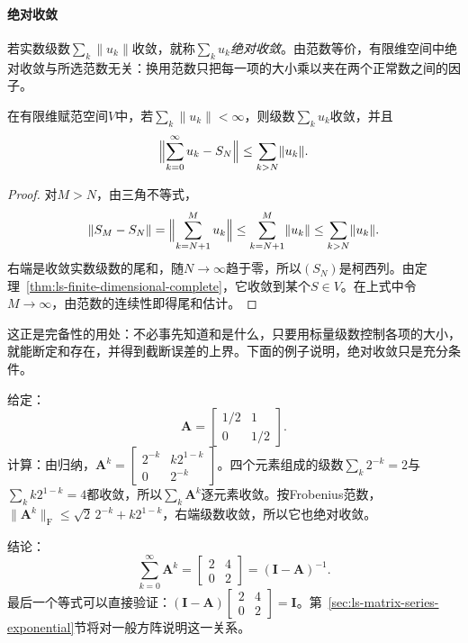 \paragraph{绝对收敛}
若实数级数$\sum_k\lVert u_k\rVert$收敛，就称$\sum_ku_k$\emph{绝对收敛}。由范数等价，有限维空间中绝对收敛与所选范数无关：换用范数只把每一项的大小乘以夹在两个正常数之间的因子。
\begin{theorem}[绝对收敛的级数收敛]
\label{thm:ls-absolute-series-convergence}
在有限维赋范空间$V$中，若$\sum_k\lVert u_k\rVert<\infty$，则级数$\sum_ku_k$收敛，并且
\[
 \Bigl\lVert\sum_{k=0}^\infty u_k-S_N\Bigr\rVert\leq\sum_{k>N}\lVert u_k\rVert .
\]
\end{theorem}
\begin{proof}
对$M>N$，由三角不等式，
\[
 \lVert S_M-S_N\rVert=\Bigl\lVert\sum_{k=N+1}^Mu_k\Bigr\rVert\leq\sum_{k=N+1}^M\lVert u_k\rVert\leq\sum_{k>N}\lVert u_k\rVert .
\]
右端是收敛实数级数的尾和，随$N\to\infty$趋于零，所以$(S_N)$是柯西列。由定理~\ref{thm:ls-finite-dimensional-complete}，它收敛到某个$S\in V$。在上式中令$M\to\infty$，由范数的连续性即得尾和估计。
\end{proof}
这正是完备性的用处：不必事先知道和是什么，只要用标量级数控制各项的大小，就能断定和存在，并得到截断误差的上界。下面的例子说明，绝对收敛只是充分条件。
\begin{example}[矩阵几何级数]
\label{ex:ls-matrix-geometric-series}
给定：
\[
 \bm A=\begin{bmatrix}1/2&1\\0&1/2\end{bmatrix}.
\]
计算：由归纳，$\bm A^k=\begin{bmatrix}2^{-k}&k2^{1-k}\\0&2^{-k}\end{bmatrix}$。四个元素组成的级数$\sum_k2^{-k}=2$与$\sum_kk2^{1-k}=4$都收敛，所以$\sum_k\bm A^k$逐元素收敛。按Frobenius范数，$\lVert\bm A^k\rVert_{\mathrm F}\leq\sqrt2\,2^{-k}+k2^{1-k}$，右端级数收敛，所以它也绝对收敛。

结论：
\[
 \sum_{k=0}^\infty\bm A^k=\begin{bmatrix}2&4\\0&2\end{bmatrix}=(\bm I-\bm A)^{-1}.
\]
最后一个等式可以直接验证：$(\bm I-\bm A)\begin{bmatrix}2&4\\0&2\end{bmatrix}=\bm I$。第~\ref{sec:ls-matrix-series-exponential}节将对一般方阵说明这一关系。
\end{example}

